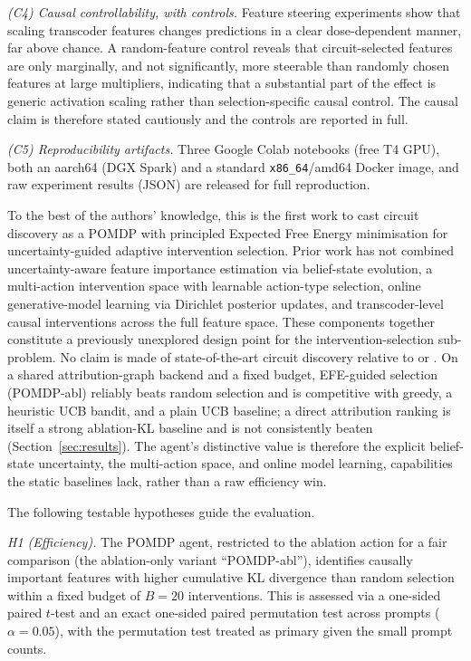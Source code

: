 \emph{(C4) Causal controllability, with controls.} Feature steering experiments
show that scaling transcoder features changes predictions in a clear dose-dependent
manner, far above chance. A random-feature control reveals that
circuit-selected features are only marginally, and not significantly, more
steerable than randomly chosen features at large multipliers, indicating that a
substantial part of the effect is generic activation scaling rather than
selection-specific causal control. The causal claim is therefore stated cautiously
and the controls are reported in full.

\emph{(C5) Reproducibility artifacts.} Three Google Colab notebooks (free T4 GPU),
both an aarch64 (DGX Spark) and a standard \texttt{x86\_64}/amd64 Docker image, and
raw experiment results (JSON) are released for full reproduction.

To the best of the authors' knowledge, this is the first
work to cast circuit discovery as a POMDP with principled Expected Free Energy
minimisation for uncertainty-guided adaptive intervention selection. Prior work has
not combined uncertainty-aware feature importance estimation via belief-state
evolution, a multi-action intervention space with learnable action-type
selection, online generative-model learning via Dirichlet posterior updates,
and transcoder-level causal interventions across the full feature space. These
components together constitute a previously unexplored design
point for the intervention-selection sub-problem. No claim is made of
state-of-the-art circuit discovery relative to \ACDC{} or \EAP{}. On a shared
attribution-graph backend and a fixed budget, EFE-guided selection (POMDP-abl)
reliably beats random selection and is competitive with greedy, a heuristic UCB
bandit, and a plain UCB baseline; a direct \EAP{} attribution ranking is itself a
strong ablation-KL baseline and is not consistently beaten
(Section~\ref{sec:results}). The agent's distinctive value is therefore the explicit
belief-state uncertainty, the multi-action space, and online model learning,
capabilities the static baselines lack, rather than a raw efficiency win.

The following testable hypotheses guide the evaluation.

\emph{H1 (Efficiency).}  The POMDP agent, restricted to the ablation
action for a fair comparison (the ablation-only variant ``POMDP-abl''),
identifies causally important features with higher cumulative KL
divergence than random selection within a fixed budget of $B=20$
interventions. This is assessed via a one-sided paired $t$-test and an exact
one-sided paired permutation test across prompts ($\alpha = 0.05$), with the
permutation test treated as primary given the small prompt counts.

